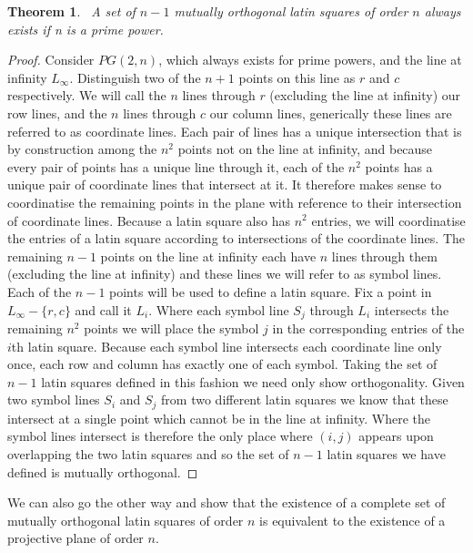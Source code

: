 \documentclass{article}
\newtheorem{theorem}{Theorem}
\begin{document}
    \begin{theorem}~\label{thm:mols}
        A set of \(n - 1\) mutually orthogonal latin squares of order \(n\) always exists if n is a prime power.
    \end{theorem}
    \begin{proof}
        Consider \(PG(2, n)\), which always exists for prime powers, and the line at infinity \(L_{\infty}\). Distinguish two of the \(n + 1\) points on this line as \(r\) and \(c\) respectively. 
        We will call the \(n\) lines through \(r\) (excluding the line at infinity) our row lines, and the \(n\) lines through \(c\) our column lines, generically these lines are referred to as coordinate lines.
        Each pair of lines has a unique intersection that is by construction among the \(n^2\) points not on the line at infinity, and because every pair of points has a unique line through it, each of the \(n ^ 2\) points has a unique pair of coordinate lines that intersect at it.
        It therefore makes sense to coordinatise the remaining points in the plane with reference to their intersection of coordinate lines. Because a latin square also has \(n ^ 2\) entries, we will coordinatise the entries of a latin square according to intersections of the coordinate lines.
        The remaining \(n - 1\) points on the line at infinity each have \(n\) lines through them (excluding the line at infinity) and these lines we will refer to as symbol lines. Each of the \(n - 1\) points will be used to define a latin square. Fix a point in \(L_{\infty} - \{r, c\}\) and call it \(L_i\). 
        Where each symbol line \(S_j\) through \(L_i\) intersects the remaining \(n^2\) points we will place the symbol \(j\) in the corresponding entries of the \(i\)th latin square. Because each symbol line intersects each coordinate line only once, each row and column has exactly one of each symbol.
        Taking the set of \(n - 1\) latin squares defined in this fashion we need only show orthogonality. Given two symbol lines \(S_i\) and \(S_j\) from two different latin squares we know that these intersect at a single point which cannot be in the line at infinity. 
        Where the symbol lines intersect is therefore the only place where \((i, j)\) appears upon overlapping the two latin squares and so the set of \(n - 1\) latin squares we have defined is mutually orthogonal. 
      \end{proof}

      We can also go the other way and show that the existence of a complete set of mutually orthogonal latin squares of order \(n\) is equivalent to the existence of a projective plane of order \(n\).
\end{document}
